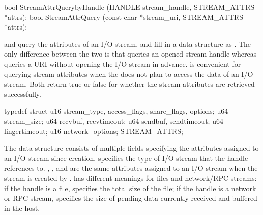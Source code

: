 \begin{paldef}
bool StreamAttrQuerybyHandle (HANDLE stream_handle,
                              STREAM_ATTRS *attrs);
bool StreamAttrQuery (const char *stream_uri, STREAM_ATTRS *attrs);

\end{paldef}

 and  query the attributes of an I/O stream, and fill in a data structure as .
The only difference between the two \hostapis{} is that  queries an opened stream handle whereas  queries a URI without opening the I/O stream in advance.
 is convenient for querying stream attributes when the \libos{} does not plan to access the data of an I/O stream.
Both \hostapis{} return true or false for whether the stream attributes are retrieved successfully.







\begin{paldef}
typedef struct {
    u16 stream_type, access_flags, share_flags, options;
    u64 stream_size;
    u64 recvbuf, recvtimeout;
    u64 sendbuf, sendtimeout;
    u64 lingertimeout;
    u16 network_options;
} STREAM_ATTRS;
\end{paldef}


The  data structure consists of multiple fields specifying the attributes assigned to an I/O stream since creation.
 specifies the type of I/O stream that the handle references to.
, , and  are the same attributes assigned to an I/O stream when the stream is created by .
 has different meanings for files and network/RPC streams:
if the handle is a file,  specifies the total size of the file;
if the handle is a network or RPC stream,  specifies the size of pending data currently received and buffered in the host.


